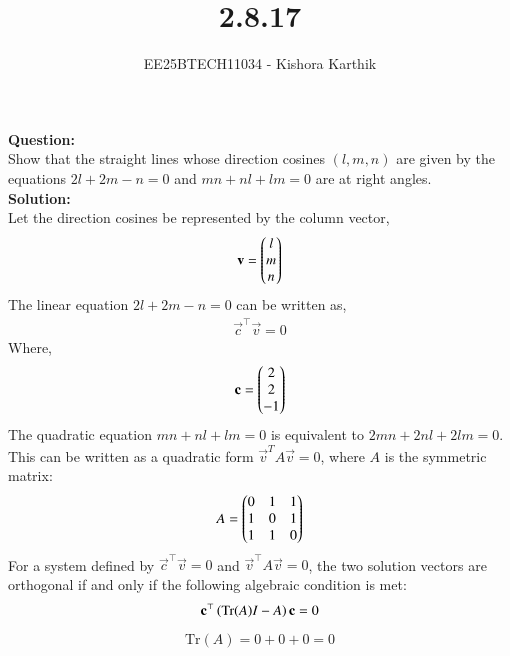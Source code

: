 \documentclass[journal]{IEEEtran}
\begin{document}

\vspace{3cm}

\title{2.8.17}
\author{EE25BTECH11034 - Kishora Karthik}
{\let\newpage\relax\maketitle}

\renewcommand{\thefigure}{\theenumi}
\renewcommand{\thetable}{\theenumi}
\textbf{Question:}\\
Show that the straight lines whose direction cosines $(l, m, n)$ are given by the equations $2l + 2m - n = 0$ and $mn + nl + lm = 0$ are at right angles.\\
\textbf{Solution:}\\
Let the direction cosines be represented by the column vector,
\begin{align}
    \mathbf{v}=\begin{pmatrix}l \\ m \\ n\end{pmatrix}
\end{align}
The linear equation $2l + 2m - n = 0$ can be written as,
\begin{align}
    \vec{c}^\top\vec{v}=0
\end{align}
Where,
\begin{align}
    \mathbf{c}=\begin{pmatrix}2\\2\\-1\end{pmatrix}
\end{align}
The quadratic equation $mn + nl + lm = 0$ is equivalent to $2mn + 2nl + 2lm = 0$. This can be written as a quadratic form $\vec{v}^T A \vec{v} = 0$, where $A$ is the symmetric matrix:
\begin{align}
     A = \begin{pmatrix} 0 & 1 & 1 \\ 1 & 0 & 1 \\ 1 & 1 & 0\end{pmatrix} 
\end{align}
For a system defined by $\vec{c}^\top \vec{v} = 0$ and $\vec{v}^\top A \vec{v} = 0$, the two solution vectors are orthogonal if and only if the following algebraic condition is met:
\begin{align}
     \mathbf{c}^\top \left(\text{Tr}(A)I - A\right)\mathbf{c} = 0
\end{align}
\begin{align}
    \text{Tr}(A) = 0 + 0 + 0 = 0
\end{align}
\end{document}
